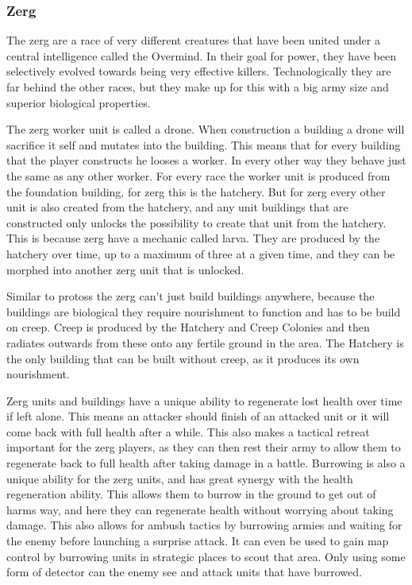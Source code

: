 \subsubsection{Zerg}
 The zerg are a race of very different creatures that have been united under a central intelligence called the Overmind. In their goal for power, they have been selectively evolved towards being very effective killers. Technologically they are far behind the other races, but they make up for this with a big army size and superior biological properties. 

 The zerg worker unit is called a drone. When construction a building a drone will sacrifice it self and mutates into the building. This means that for every building that the player constructs he looses a worker. In every other way they behave just the same as any other worker. For every race the worker unit is produced from the foundation building, for zerg this is the hatchery. But for zerg every other unit is also created from the hatchery, and any unit buildings that are constructed only unlocks the possibility to create that unit from the hatchery. This is because zerg have a mechanic called larva. They are produced by the hatchery over time, up to a maximum of three at a given time, and they can be morphed into another zerg unit that is unlocked. 

 Similar to protoss the zerg can't just build buildings anywhere, because the buildings are biological they require nourishment to function and has to be build on creep. Creep is produced by the Hatchery and Creep Colonies and then radiates outwards from these onto any fertile ground in the area. The Hatchery is the only building that can be built without creep, as it produces its own nourishment. 

 Zerg units and buildings have a unique ability to regenerate lost health over time if left alone. This means an attacker should finish of an attacked unit or it will come back with full health after a while. This also makes a tactical retreat important for the zerg players, as they can then rest their army to allow them to regenerate back to full health after taking damage in a battle. Burrowing is also a unique ability for the zerg units, and has great synergy with the health regeneration ability. This allows them to burrow in the ground to get out of harms way, and here they can regenerate health without worrying about taking damage. This also allows for ambush tactics by burrowing armies and waiting for the enemy before launching a surprise attack. It can even be used to gain map control by burrowing units in strategic places to scout that area. Only using some form of detector can the enemy see and attack units that have burrowed. 